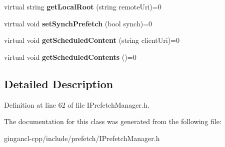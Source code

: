 \begin{CompactItemize}
\item 
virtual string \textbf{getLocalRoot} (string remoteUri)=0\label{classbr_1_1pucrio_1_1telemidia_1_1ginga_1_1ncl_1_1prefetch_1_1IPrefetchManager_3095ed2f1a684abf89d0a9f7d89e9fdb}

\item 
virtual void \textbf{setSynchPrefetch} (bool synch)=0\label{classbr_1_1pucrio_1_1telemidia_1_1ginga_1_1ncl_1_1prefetch_1_1IPrefetchManager_ff978ce3d6f66ec0b07c2a566d519120}

\item 
virtual void \textbf{getScheduledContent} (string clientUri)=0\label{classbr_1_1pucrio_1_1telemidia_1_1ginga_1_1ncl_1_1prefetch_1_1IPrefetchManager_e0f81c6b7934fca71a6e132bff32161b}

\item 
virtual void \textbf{getScheduledContents} ()=0\label{classbr_1_1pucrio_1_1telemidia_1_1ginga_1_1ncl_1_1prefetch_1_1IPrefetchManager_7b4dfae0bfb0535cd62907cf68cfb43f}

\end{CompactItemize}


\subsection{Detailed Description}




Definition at line 62 of file IPrefetchManager.h.

The documentation for this class was generated from the following file:\begin{CompactItemize}
\item 
gingancl-cpp/include/prefetch/IPrefetchManager.h\end{CompactItemize}
